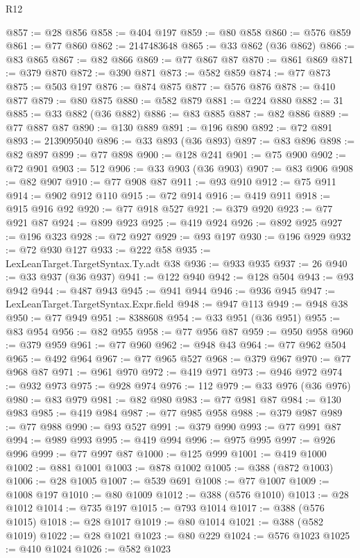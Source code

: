 \begin{lexlean}{R12}
\begin{coremodule}
@857 := @28 @856
@858 := @404 @197
@859 := @80 @858
@860 := @576 @859
@861 := @77 @860
@862 := 2147483648
@865 := @33 @862 (@36 @862)
@866 := @83 @865
@867 := @82 @866
@869 := @77 @867 @87
@870 := @861 @869
@871 := @379 @870
@872 := @390 @871
@873 := @582 @859
@874 := @77 @873
@875 := @503 @197
@876 := @874 @875
@877 := @576 @876
@878 := @410 @877
@879 := @80 @875
@880 := @582 @879
@881 := @224 @880
@882 := 31
@885 := @33 @882 (@36 @882)
@886 := @83 @885
@887 := @82 @886
@889 := @77 @887 @87
@890 := @130 @889
@891 := @196 @890
@892 := @72 @891
@893 := 2139095040
@896 := @33 @893 (@36 @893)
@897 := @83 @896
@898 := @82 @897
@899 := @77 @898
@900 := @128 @241
@901 := @75 @900
@902 := @72 @901
@903 := 512
@906 := @33 @903 (@36 @903)
@907 := @83 @906
@908 := @82 @907
@910 := @77 @908 @87
@911 := @93 @910
@912 := @75 @911
@914 := @902 @912 @110
@915 := @72 @914
@916 := @419 @911
@918 := @915 @916 @92
@920 := @77 @918 @527
@921 := @379 @920
@923 := @77 @921 @87
@924 := @899 @923
@925 := @419 @924
@926 := @892 @925
@927 := @196 @323
@928 := @72 @927
@929 := @93 @197
@930 := @196 @929
@932 := @72 @930 @127
@933 := @222 @58
@935 := LexLeanTarget.TargetSyntax.Ty.adt @38
@936 := @933 @935
@937 := 26
@940 := @33 @937 (@36 @937)
@941 := @122 @940
@942 := @128 @504
@943 := @93 @942
@944 := @487 @943
@945 := @941 @944
@946 := @936 @945
@947 := LexLeanTarget.TargetSyntax.Expr.field
@948 := @947 @113
@949 := @948 @38
@950 := @77 @949
@951 := 8388608
@954 := @33 @951 (@36 @951)
@955 := @83 @954
@956 := @82 @955
@958 := @77 @956 @87
@959 := @950 @958
@960 := @379 @959
@961 := @77 @960
@962 := @948 @43
@964 := @77 @962 @504
@965 := @492 @964
@967 := @77 @965 @527
@968 := @379 @967
@970 := @77 @968 @87
@971 := @961 @970
@972 := @419 @971
@973 := @946 @972
@974 := @932 @973
@975 := @928 @974
@976 := 112
@979 := @33 @976 (@36 @976)
@980 := @83 @979
@981 := @82 @980
@983 := @77 @981 @87
@984 := @130 @983
@985 := @419 @984
@987 := @77 @985 @958
@988 := @379 @987
@989 := @77 @988
@990 := @93 @527
@991 := @379 @990
@993 := @77 @991 @87
@994 := @989 @993
@995 := @419 @994
@996 := @975 @995
@997 := @926 @996
@999 := @77 @997 @87
@1000 := @125 @999
@1001 := @419 @1000
@1002 := @881 @1001
@1003 := @878 @1002
@1005 := @388 (@872 @1003)
@1006 := @28 @1005
@1007 := @539 @691
@1008 := @77 @1007
@1009 := @1008 @197
@1010 := @80 @1009
@1012 := @388 (@576 @1010)
@1013 := @28 @1012
@1014 := @735 @197
@1015 := @793 @1014
@1017 := @388 (@576 @1015)
@1018 := @28 @1017
@1019 := @80 @1014
@1021 := @388 (@582 @1019)
@1022 := @28 @1021
@1023 := @80 @229
@1024 := @576 @1023
@1025 := @410 @1024
@1026 := @582 @1023

\end{coremodule}
\end{lexlean}
